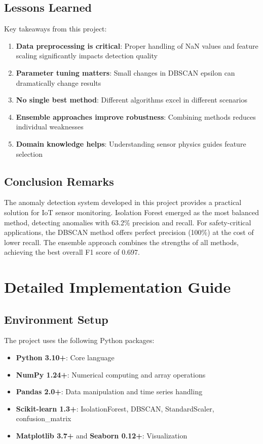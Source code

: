 \documentclass[12pt,a4paper]{report}
\begin{document}
\section{Lessons Learned}

Key takeaways from this project:
\begin{enumerate}
    \item \textbf{Data preprocessing is critical}: Proper handling of NaN values and feature scaling significantly impacts detection quality
    \item \textbf{Parameter tuning matters}: Small changes in DBSCAN epsilon can dramatically change results
    \item \textbf{No single best method}: Different algorithms excel in different scenarios
    \item \textbf{Ensemble approaches improve robustness}: Combining methods reduces individual weaknesses
    \item \textbf{Domain knowledge helps}: Understanding sensor physics guides feature selection
\end{enumerate}

\section{Conclusion Remarks}

The anomaly detection system developed in this project provides a practical solution for IoT sensor monitoring. Isolation Forest emerged as the most balanced method, detecting anomalies with 63.2\% precision and recall. For safety-critical applications, the DBSCAN method offers perfect precision (100\%) at the cost of lower recall. The ensemble approach combines the strengths of all methods, achieving the best overall F1 score of 0.697.

\chapter{Detailed Implementation Guide}
\label{ch:implementation_guide}

\section{Environment Setup}

The project uses the following Python packages:
\begin{itemize}
    \item \textbf{Python 3.10+}: Core language
    \item \textbf{NumPy 1.24+}: Numerical computing and array operations
    \item \textbf{Pandas 2.0+}: Data manipulation and time series handling
    \item \textbf{Scikit-learn 1.3+}: IsolationForest, DBSCAN, StandardScaler, confusion\_matrix
    \item \textbf{Matplotlib 3.7+} and \textbf{Seaborn 0.12+}: Visualization
\end{itemize}
\end{document}

